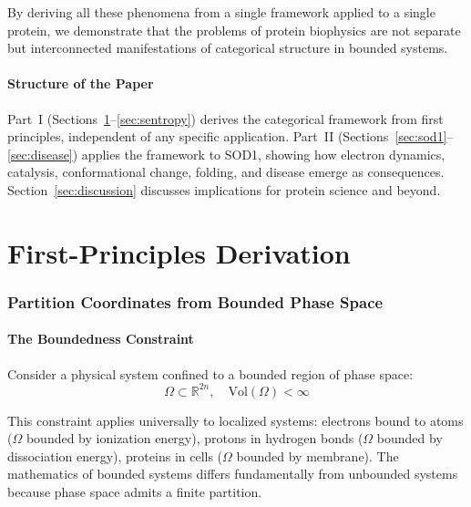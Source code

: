 \documentclass[twocolumn,aps,prx,superscriptaddress,longbibliography]{revtex4-2}
\theoremstyle{remark}
\begin{document}
By deriving all these phenomena from a single framework applied to a single
protein, we demonstrate that the problems of protein biophysics are not
separate but interconnected manifestations of categorical structure in
bounded systems.

\subsection{Structure of the Paper}

Part~I (Sections~\ref{sec:partition}--\ref{sec:sentropy}) derives the
categorical framework from first principles, independent of any specific
application. Part~II (Sections~\ref{sec:sod1}--\ref{sec:disease}) applies
the framework to SOD1, showing how electron dynamics, catalysis,
conformational change, folding, and disease emerge as consequences.
Section~\ref{sec:discussion} discusses implications for protein science
and beyond.

\part{First-Principles Derivation}

\section{Partition Coordinates from Bounded Phase Space}
\label{sec:partition}

\subsection{The Boundedness Constraint}

Consider a physical system confined to a bounded region of phase space:
\begin{equation}
\Omega \subset \mathbb{R}^{2n}, \quad \text{Vol}(\Omega) < \infty
\label{eq:bounded}
\end{equation}

This constraint applies universally to localized systems: electrons bound
to atoms ($\Omega$ bounded by ionization energy), protons in hydrogen bonds
($\Omega$ bounded by dissociation energy), proteins in cells ($\Omega$
bounded by membrane). The mathematics of bounded systems differs fundamentally
from unbounded systems because phase space admits a finite partition.
\end{document}
